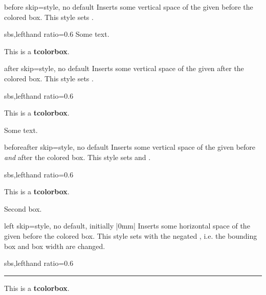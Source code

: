 \begin{docTcbKey}[][doc new and updated={2014-10-10}{2014-11-07}]{before skip}{=}{style, no default}
  Inserts some vertical space of the given  before the colored box.
  This style sets .
\begin{dispExample*}{sbs,lefthand ratio=0.6}
Some text.
\begin{tcolorbox}[before skip=1cm,
    colframe=red!50!white]
  This is a \textbf{tcolorbox}.
\end{tcolorbox}
\end{dispExample*}
\end{docTcbKey}

\begin{docTcbKey}[][doc new and updated={2014-10-10}{2014-11-07}]{after skip}{=}{style, no default}
  Inserts some vertical space of the given  after the colored box.
  This style sets .
\begin{dispExample*}{sbs,lefthand ratio=0.6}
\begin{tcolorbox}[after skip=1cm,
    colframe=red!50!white]
  This is a \textbf{tcolorbox}.
\end{tcolorbox}
Some text.
\end{dispExample*}
\end{docTcbKey}

\begin{docTcbKey}[][doc new=2014-10-10]{beforeafter skip}{=}{style, no default}
  Inserts some vertical space of the given  before \emph{and} after the colored box.
  This style sets  and .
\begin{dispExample*}{sbs,lefthand ratio=0.6}
\begin{tcolorbox}
  This is a \textbf{tcolorbox}.
\end{tcolorbox}
\begin{tcolorbox}
  Second box.
\end{tcolorbox}
\end{dispExample*}
\end{docTcbKey}

\clearpage

\begin{docTcbKey}[][doc new=2014-11-07]{left skip}{=}{style, no default, initially |0mm|}
  Inserts some horizontal space of the given  before the colored box.
  This style sets  with the negated ,
  i.e. the bounding box and box width are changed.
\begin{dispExample*}{sbs,lefthand ratio=0.6}
\noindent\rule{\linewidth}{2pt}

\begin{tcolorbox}[left skip=1cm,
    colframe=red!50!white]
  This is a \textbf{tcolorbox}.
\end{tcolorbox}
\end{dispExample*}
\end{docTcbKey}

